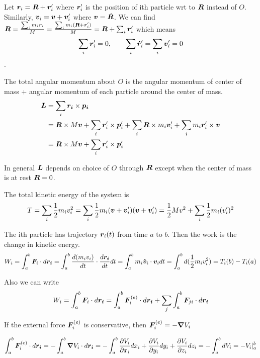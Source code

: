 \documentclass[12pt]{article}
\begin{document}
Let $\boldsymbol{r}_i = \boldsymbol{R} + \boldsymbol{r}_i'$ where $\boldsymbol{r}_i'$ is the position of ith particle wrt to $\boldsymbol{R}$ instead of $O$. Similarly, $\boldsymbol{v}_i = \boldsymbol{v} + \boldsymbol{v}_i'$ where $\boldsymbol{v} = \dot{\boldsymbol{R}}$.  We can find $\boldsymbol{R} = \frac{\sum_i m_i \boldsymbol{r}_i}{M} = \frac{\sum_i m_i (\boldsymbol{R} + \boldsymbol{r}_i')}{M} = \boldsymbol{R} + \sum_i \boldsymbol{r}_i' $ which means $$\sum_i  \boldsymbol{r}_i' = 0, \quad\quad \sum_i  \boldsymbol{\dot{r}}_i' = \sum_i  \boldsymbol{v}_i' = 0 $$.

\begin{theorem}
\textnormal{The total angular momentum about $O$ is the angular momentum of center of mass + angular momentum of each particle around the center of mass.}
$$\begin{aligned}
	\boldsymbol{L} &=  \sum_i \boldsymbol{r_i}\times \boldsymbol{p_i} \\
	       &=\boldsymbol{R}\times M \boldsymbol{v} + \sum_i \boldsymbol{r}_i'\times \boldsymbol{p}_i' + \sum_i \boldsymbol{R}\times m_i \boldsymbol{v}_i' + \sum_i m_i \boldsymbol{r}_i' \times \boldsymbol{v} \\
	       &=    \boldsymbol{R}\times M \boldsymbol{v} + \sum_i \boldsymbol{r}_i'\times \boldsymbol{p}_i'
\end{aligned}
$$
\end{theorem}

In general $\boldsymbol{L}$ depends on choice of $O$ through $\boldsymbol{R}$ except when the center of mass is at rest $\boldsymbol{R} = 0$.

\begin{theorem}
\textnormal{The total kinetic energy of the system is }$$
T = \sum_i \frac{1}{2}m_i v_i^2 =  \sum_i \frac{1}{2} m_i (\boldsymbol{v} + \boldsymbol{v}_i') (\boldsymbol{v} + \boldsymbol{v}_i') = \frac{1}{2} M v^2 + \sum_i \frac{1}{2}m_i (v_i')^2 
$$
\end{theorem}

The ith particle has trajectory $\boldsymbol{r}_i(t)$ from time $a$ to $b$. Then the work is the change in kinetic energy.
$$W_i = \int_a^b \boldsymbol{F}_i  \cdot  d\boldsymbol{r_i} =  \int_a^b \frac{d(m_i v_i)}{dt}   \cdot  \frac{d \boldsymbol{r_i}}{dt} dt =  \int_a^b  m_i \boldsymbol{\dot{v}}_i  \cdot \boldsymbol{v}_i dt =  \int_a^b  d(\frac{1}{2} m_i v_i^2) = T_i(b) - T_i(a)$$

Also we can write 
$$
 W_i = \int_a^b \boldsymbol{F}_i  \cdot  d\boldsymbol{r_i}  = \int_a^b \boldsymbol{F}_i^{(e)}  \cdot  d\boldsymbol{r_i}  +  \sum_j \int_a^b \boldsymbol{F}_{ji} \cdot  d\boldsymbol{r_i}
$$

If the external force $\boldsymbol{F}_i^{(e)}$ is conservative, then $\boldsymbol{F}_i^{(e)} = -\grad{V_i}$

$$
   \int_a^b \boldsymbol{F}_i^{(e)}  \cdot  d\boldsymbol{r_i}
    = - \int_a^b \grad{V_i} \cdot  d\boldsymbol{r_i} 
    = - \int_a^b \frac{\partial V_i}{\partial x_i} dx_i + \frac{\partial V_i}{\partial y_i} dy_i +  \frac{\partial V_i}{\partial z_i} dz_i 
    = -\int_a^b dV_i 
    =- V_i |^b_a 
$$
\end{document}
